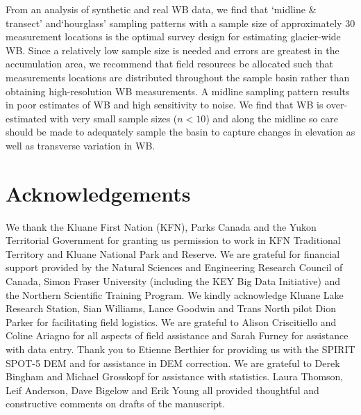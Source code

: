 \documentclass[twocolumn,letterpaper]{igs}
\begin{document}
From an analysis of synthetic and real WB data, we find that `midline \& transect' and`hourglass' sampling patterns with a sample size of approximately 30 measurement locations is the optimal survey design for estimating glacier-wide WB. Since a relatively low sample size is needed and errors are greatest in the accumulation area, we recommend that field resources be allocated such that measurements locations are distributed throughout the sample basin rather than obtaining high-resolution WB measurements. A midline sampling pattern results in poor estimates of WB and high sensitivity to noise. We find that WB is over-estimated with very small sample sizes ($n<10$) and along the midline so care should be made to adequately sample the basin to capture changes in elevation as well as transverse variation in WB. 

\section{Acknowledgements}

We thank the Kluane First Nation (KFN), Parks Canada and the Yukon Territorial Government for granting us permission to work in KFN Traditional Territory and Kluane National Park and Reserve. We are grateful for financial support provided by the Natural Sciences and Engineering Research Council of Canada, Simon Fraser University (including the KEY Big Data Initiative) and the Northern Scientific Training Program. We kindly acknowledge Kluane Lake Research Station, Sian Williams, Lance Goodwin and Trans North pilot Dion Parker for facilitating field logistics. We are grateful to Alison Criscitiello and Coline Ariagno for all aspects of field assistance and Sarah Furney for assistance with data entry. Thank you to Etienne Berthier for providing us with the SPIRIT SPOT-5 DEM and for assistance in DEM correction. We are grateful to Derek Bingham and Michael Grosskopf for assistance with statistics. Laura Thomson, Leif Anderson, Dave Bigelow and Erik Young all provided thoughtful and constructive comments on drafts of the manuscript.


%
%
%



\end{document}
